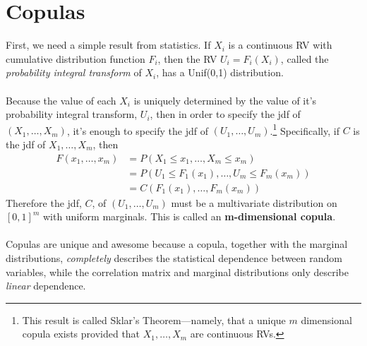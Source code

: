 \documentclass[a4paper,12pt]{scrartcl}
\begin{document}

\newpage
\appendix

\section{Copulas}

First, we need a simple result from statistics. If $X_i$ is a continuous
RV with cumulative distribution function $F_i$, then the RV $U_i = 
F_i(X_i)$, called the \emph{probability integral transform} of $X_i$,
has a Unif(0,1) distribution.  
\\
\\
Because the value of each $X_i$ is
uniquely determined by the value of it's probability integral transform,
$U_i$, then in order to specify the jdf of $(X_1, \ldots, X_m)$,
it's enough to specify the jdf of $(U_1, \ldots, U_m)$.\footnote{This
result is called Sklar's Theorem---namely, that a unique $m$ dimensional
copula exists provided that $X_1, \ldots, X_m$ are continuous RVs.}
Specifically, if $C$ is the jdf of $X_1, \ldots, X_m$, then
\begin{align*}
   F(x_1, \ldots, x_m) &= P(X_1 \leq x_1, \ldots, X_m \leq x_m)\\
   &= P(U_1 \leq F_1(x_1), \ldots, U_m \leq F_m(x_m) )\\
   &= C(F_1(x_1), \ldots, F_m(x_m))
\end{align*}
Therefore the jdf, $C$, of $(U_1, \ldots,U_m)$ must be a multivariate
distribution on $[0,1]^m$ with uniform marginals. This is called
an \textbf{m-dimensional copula}.
\\
\\
Copulas are unique and awesome because a copula, together with
the marginal distributions, \emph{completely} describes
the statistical dependence between random variables, while the 
correlation matrix and marginal distributions only describe
\emph{linear} dependence. 
\end{document}
